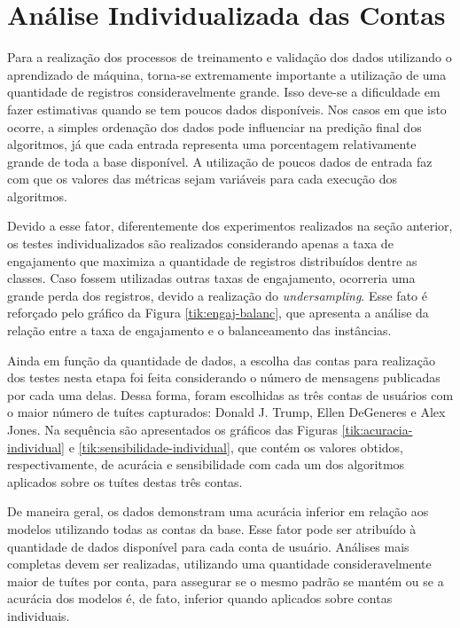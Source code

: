 \documentclass[oneside,openright,12pt]{ufsm_2015} %
\begin{document}

\section{Análise Individualizada das Contas}
\label{sec:exp-analise-individual}

    \par Para a realização dos processos de treinamento e validação dos dados utilizando o aprendizado de máquina, torna-se extremamente importante a utilização de uma quantidade de registros consideravelmente grande. Isso deve-se a dificuldade em fazer estimativas quando se tem poucos dados disponíveis. Nos casos em que isto ocorre, a simples ordenação dos dados pode influenciar na predição final dos algoritmos, já que cada entrada representa uma porcentagem relativamente grande de toda a base disponível. A utilização de poucos dados de entrada faz com que os valores das métricas sejam variáveis para cada execução dos algoritmos.

    \par Devido a esse fator, diferentemente dos experimentos realizados na seção anterior, os testes individualizados são realizados considerando apenas a taxa de engajamento que maximiza a quantidade de registros distribuídos dentre as classes. Caso fossem utilizadas outras taxas de engajamento, ocorreria uma grande perda dos registros, devido a realização do \textit{undersampling}. Esse fato é reforçado pelo gráfico da Figura \ref{tik:engaj-balanc}, que apresenta a análise da relação entre a taxa de engajamento e o balanceamento das instâncias. 
    
    \par Ainda em função da quantidade de dados, a escolha das contas para realização dos testes nesta etapa foi feita considerando o número de mensagens publicadas por cada uma delas. Dessa forma, foram escolhidas as três contas de usuários com o maior número de tuítes capturados: Donald J. Trump, Ellen DeGeneres e Alex Jones. Na sequência são apresentados os gráficos das Figuras \ref{tik:acuracia-individual} e \ref{tik:sensibilidade-individual}, que contém os valores obtidos, respectivamente, de acurácia e sensibilidade com cada um dos algoritmos aplicados sobre os tuítes destas três contas.
    
    \par De maneira geral, os dados demonstram uma acurácia inferior em relação aos modelos utilizando todas as contas da base. Esse fator pode ser atribuído à quantidade de dados disponível para cada conta de usuário. Análises mais completas devem ser realizadas, utilizando uma quantidade consideravelmente maior de tuítes por conta, para assegurar se o mesmo padrão se mantém ou se a acurácia dos modelos é, de fato, inferior quando aplicados sobre contas individuais.
    
\end{document}
